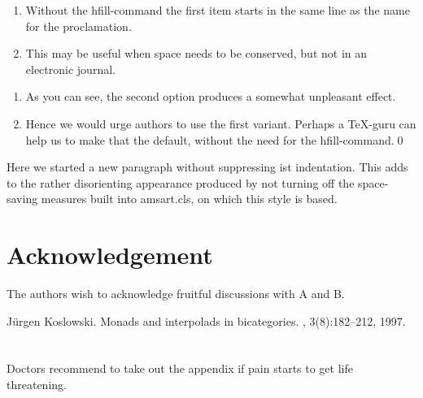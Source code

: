 \documentclass{lmcs}
\theoremstyle{plain}\newtheorem{satz}[thm]{Satz}
\begin{document}
\begin{thm}\label{T:en} %

\begin{enumerate}
\item
  Without the hfill-command the first item starts in the same line as
  the name for the proclamation.
\item
  This may be useful when space needs to be conserved, but not in an
  electronic journal.
\end{enumerate}
\end{thm}

\proof %
\begin{enumerate}
\item
  As you can see, the second option produces a somewhat unpleasant effect.
\item
  Hence we would urge authors to use the first variant.  Perhaps a
  \TeX-guru can help us to make that the default, without the need for
  the hfill-command.\qed
\end{enumerate}

  Here we started a new paragraph without suppressing ist
  indentation.  This adds to the rather disorienting appearance
  produced by not turning off the space-saving measures built into
  amsart.cls, on which this style is based.

\section*{Acknowledgement}
  The authors wish to acknowledge fruitful discussions with A and B.


\begin{thebibliography}{Kos97}

J{\"u}rgen Koslowski.
\newblock Monads and interpolads in bicategories.
, 3(8):182--212, 1997.

\end{thebibliography}

\appendix
\section{}

  Doctors recommend to take out the appendix if pain starts to get
  life threatening.
\end{document}
